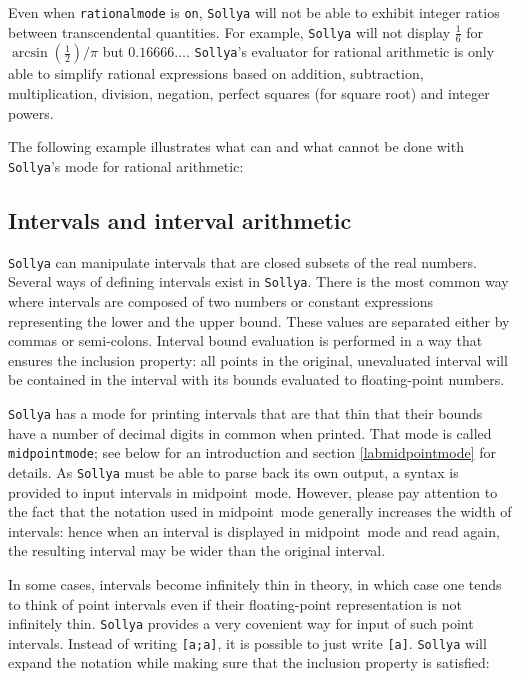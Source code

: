 \documentclass[a4paper]{article}
\newcommand{\com}[1]{\texttt{#1}}
\newcommand{\sollya}{\texttt{Sollya}\xspace}
\begin{document}
Even when \com{rationalmode} is \com{on}, \sollya will not be able to
exhibit integer ratios between transcendental quantities. For example,
\sollya will not display $\frac{1}{6}$ for $\arcsin\left(
\frac{1}{2} \right) / \pi$ but $0.16666\dots$. \sollya's evaluator
for rational arithmetic is only able to simplify rational expressions
based on addition, subtraction, multiplication, division, negation,
perfect squares (for square root) and integer powers.

The following example illustrates what can and what cannot be done
with \sollya's mode for rational arithmetic: 



\subsection{Intervals and interval arithmetic}

\sollya can manipulate intervals that are closed subsets of the real
numbers. Several ways of defining intervals exist in \sollya. There is the
most common way where intervals are composed of two numbers or
constant expressions representing the lower and the upper bound. These
values are separated either by commas or semi-colons. Interval bound 
evaluation is performed in a way that ensures the inclusion property:
all points in the original, unevaluated interval will be contained in
the interval with its bounds evaluated to floating-point numbers. 



\sollya has a mode for printing intervals that are that thin that
their bounds have a number of decimal digits in common when
printed. That mode is called \com{midpointmode}; see below for an
introduction and section \ref{labmidpointmode} for details. As \sollya
must be able to parse back its own output, a syntax is provided to
input intervals in midpoint~mode. However, please pay attention to the fact that the
notation used in midpoint~mode generally increases the width of
intervals: hence when an interval is displayed in midpoint~mode and
read again, the resulting interval may be wider than the original
interval.



In some cases, intervals become infinitely thin in theory, in which
case one tends to think of point intervals even if their
floating-point representation is not infinitely thin. \sollya provides
a very covenient way for input of such point intervals. Instead of
writing \texttt{[a;a]}, it is possible to just write
\texttt{[a]}. \sollya will expand the notation while making sure that
the inclusion property is satisfied:
\end{document}
